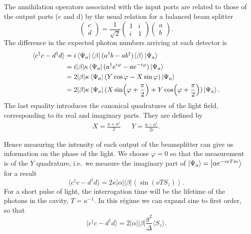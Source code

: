 The annihilation operators associated with the input ports are related to those
of the output ports (c and d) by the usual relation for a balanced beam
splitter~\cite{agarwal2012}
%
\begin{equation}
  \label{squeeze:eqn:bsmat}
  \begin{pmatrix} c \\ d \end{pmatrix} = \frac{1}{\sqrt{2}}\begin{pmatrix}
    1 & i \\ i & 1 
  \end{pmatrix}  \begin{pmatrix} a \\ b \end{pmatrix}.
\end{equation}
%
The difference in the expected photon numbers arriving at each
detector is
\begin{align}
  \langle c^\dagger c - d^\dagger d\rangle &= i
  \bra{\Psi_a}\bra{\beta}(a^\dagger b-
  ab^\dagger)\ket{\beta}\ket{\Psi_a} \\
  & = i|\beta|\kappa \bra{\Psi_a}(a^\dagger e^{i\varphi} - a
  e^{-i\varphi})\ket{\Psi_a} \\
  &= 2|\beta|\kappa\bra{\Psi_a}(Y\cos\varphi - X\sin\varphi)\ket{\Psi_a} \\
  &= 2|\beta|\kappa\bra{\Psi_a}(X\sin(\varphi+\frac{\pi}{2}) +
  Y\cos(\varphi+\frac{\pi}{2}))\ket{\Psi_a}.
  \label{squeeze:eqn:homoquads}
\end{align}
%
The last equality introduces the canonical quadratures of the light field,
corresponding to its real and imaginary parts. They are defined
by~\cite{gerry_knight_2004}
\begin{align}
  X = \frac{a + a^\dagger}{2} && Y = \frac{a - a^\dagger}{2i}.
\end{align}

Hence measuring the intensity of each output of the beamsplitter can give us
information on the phase of the light. We choose $\varphi = 0$ so that the
measurement is of the $Y$ quadrature, i.e.\ we measure the imaginary part of
$\ket{\Psi_a} = \ket{\alpha e^{-i\nu Tm}}$ for a result
%
\begin{equation}
  \langle c^\dagger c - d^\dagger d\rangle =  2\kappa
  |\alpha||\beta|\left\langle\sin(\nu T S_z)\right\rangle.
\end{equation}
%
For a short pulse of light, the interrogation time will be the lifetime of the
photons in the cavity, $T = \kappa^{-1}$. In this r\'egime we can expand sine
to first order, so that
%
\begin{equation}
  \langle c^\dagger c - d^\dagger d\rangle = 2|\alpha||\beta|
  \frac{g^2}{\Delta}\langle S_z\rangle.
  \label{eqn:homomeas}
\end{equation}


